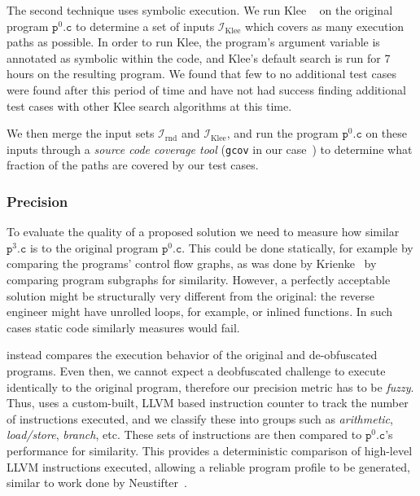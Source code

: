 The second technique uses symbolic execution. We run Klee ~\cite{cadar2008klee} on the original program $\mathtt{p}^0.\mathtt{c}$ to determine a set of inputs $\mathcal{I}_\mathrm{Klee}$ which covers as many execution paths as possible.  In order to run Klee, the program's argument variable is annotated as symbolic within the code, and Klee's default search is run for 7 hours on the resulting program.  We found that few to no additional test cases were found after this period of time and have not had success finding additional test cases with other Klee search algorithms at this time.

We then merge the input sets $\mathcal{I}_\mathrm{rnd}$ and  $\mathcal{I}_\mathrm{Klee}$, and run the program $\mathtt{p}^0.\mathtt{c}$ on these inputs through a {\em source code coverage tool} ({\tt gcov} in our case~\cite{best2003analyzing}) to determine what fraction of the paths are covered by our test cases.


\subsubsection{Precision}
\label{sec:precision}
To evaluate the quality of a proposed solution we need to measure how similar $\mathtt{p}^3.\mathtt{c}$ is to the original program $\mathtt{p}^0.\mathtt{c}$. This could be done statically, for example by comparing the programs' control flow graphs, as was done by Krienke~\cite{krinke2001identifying} by comparing program subgraphs for similarity. However, a perfectly acceptable solution might be structurally very different from the original: the reverse engineer might have unrolled loops, for example, or inlined functions. In such cases static code similarly measures would fail.

\revenge instead compares the execution behavior of the original and de-obfuscated programs.  Even then, we cannot expect a deobfuscated challenge to execute identically to the original program, therefore our precision metric has to be {\em fuzzy}. Thus, \revenge uses a custom-built, LLVM based instruction counter to track the number of instructions executed, and we classify these into groups such as {\em arithmetic}, {\em load/store}, {\em branch}, etc. These sets of instructions are then compared to $\mathtt{p}^0.\mathtt{c}$'s performance for similarity.  This provides a deterministic comparison of high-level LLVM instructions executed, allowing a reliable program profile to be generated, similar to work done by Neustifter~\cite{neustifter2010efficient}.

